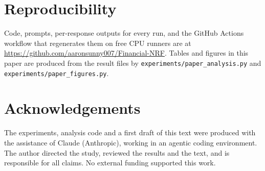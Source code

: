 \section*{Reproducibility}
Code, prompts, per-response outputs for every run, and the GitHub Actions workflow that regenerates them on free CPU runners are at \url{https://github.com/aaronsunny007/Financial-NRF}. Tables and figures in this paper are produced from the result files by \texttt{experiments/paper\_analysis.py} and \texttt{experiments/paper\_figures.py}.

\section*{Acknowledgements}
The experiments, analysis code and a first draft of this text were produced with the assistance of Claude (Anthropic), working in an agentic coding environment. The author directed the study, reviewed the results and the text, and is responsible for all claims. No external funding supported this work.
